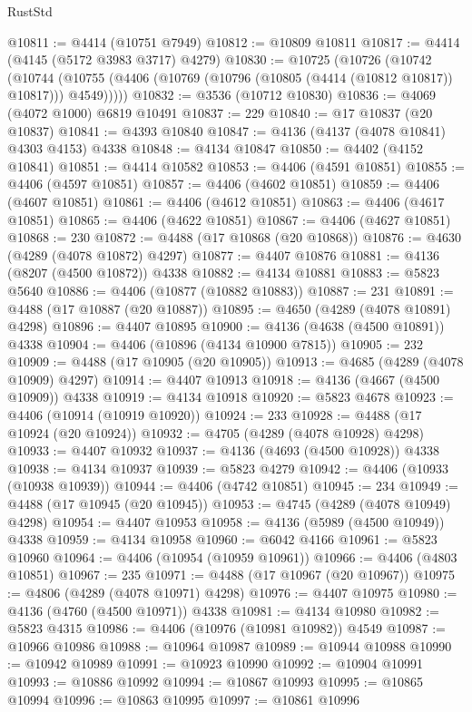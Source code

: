 \begin{lexlean}{RustStd}
\begin{coremodule}
@10811 := @4414 (@10751 @7949)
@10812 := @10809 @10811
@10817 := @4414 (@4145 (@5172 @3983 @3717) @4279)
@10830 := @10725
    (@10726
      (@10742
        (@10744 (@10755 (@4406 (@10769 (@10796 (@10805 (@4414 (@10812 @10817)) @10817))) @4549)))))
@10832 := @3536 (@10712 @10830)
@10836 := @4069 (@4072 @1000) @6819 @10491
@10837 := 229
@10840 := @17 @10837 (@20 @10837)
@10841 := @4393 @10840
@10847 := @4136 (@4137 (@4078 @10841) @4303 @4153) @4338
@10848 := @4134 @10847
@10850 := @4402 (@4152 @10841)
@10851 := @4414 @10582
@10853 := @4406 (@4591 @10851)
@10855 := @4406 (@4597 @10851)
@10857 := @4406 (@4602 @10851)
@10859 := @4406 (@4607 @10851)
@10861 := @4406 (@4612 @10851)
@10863 := @4406 (@4617 @10851)
@10865 := @4406 (@4622 @10851)
@10867 := @4406 (@4627 @10851)
@10868 := 230
@10872 := @4488 (@17 @10868 (@20 @10868))
@10876 := @4630 (@4289 (@4078 @10872) @4297)
@10877 := @4407 @10876
@10881 := @4136 (@8207 (@4500 @10872)) @4338
@10882 := @4134 @10881
@10883 := @5823 @5640
@10886 := @4406 (@10877 (@10882 @10883))
@10887 := 231
@10891 := @4488 (@17 @10887 (@20 @10887))
@10895 := @4650 (@4289 (@4078 @10891) @4298)
@10896 := @4407 @10895
@10900 := @4136 (@4638 (@4500 @10891)) @4338
@10904 := @4406 (@10896 (@4134 @10900 @7815))
@10905 := 232
@10909 := @4488 (@17 @10905 (@20 @10905))
@10913 := @4685 (@4289 (@4078 @10909) @4297)
@10914 := @4407 @10913
@10918 := @4136 (@4667 (@4500 @10909)) @4338
@10919 := @4134 @10918
@10920 := @5823 @4678
@10923 := @4406 (@10914 (@10919 @10920))
@10924 := 233
@10928 := @4488 (@17 @10924 (@20 @10924))
@10932 := @4705 (@4289 (@4078 @10928) @4298)
@10933 := @4407 @10932
@10937 := @4136 (@4693 (@4500 @10928)) @4338
@10938 := @4134 @10937
@10939 := @5823 @4279
@10942 := @4406 (@10933 (@10938 @10939))
@10944 := @4406 (@4742 @10851)
@10945 := 234
@10949 := @4488 (@17 @10945 (@20 @10945))
@10953 := @4745 (@4289 (@4078 @10949) @4298)
@10954 := @4407 @10953
@10958 := @4136 (@5989 (@4500 @10949)) @4338
@10959 := @4134 @10958
@10960 := @6042 @4166
@10961 := @5823 @10960
@10964 := @4406 (@10954 (@10959 @10961))
@10966 := @4406 (@4803 @10851)
@10967 := 235
@10971 := @4488 (@17 @10967 (@20 @10967))
@10975 := @4806 (@4289 (@4078 @10971) @4298)
@10976 := @4407 @10975
@10980 := @4136 (@4760 (@4500 @10971)) @4338
@10981 := @4134 @10980
@10982 := @5823 @4315
@10986 := @4406 (@10976 (@10981 @10982)) @4549
@10987 := @10966 @10986
@10988 := @10964 @10987
@10989 := @10944 @10988
@10990 := @10942 @10989
@10991 := @10923 @10990
@10992 := @10904 @10991
@10993 := @10886 @10992
@10994 := @10867 @10993
@10995 := @10865 @10994
@10996 := @10863 @10995
@10997 := @10861 @10996

\end{coremodule}
\end{lexlean}
